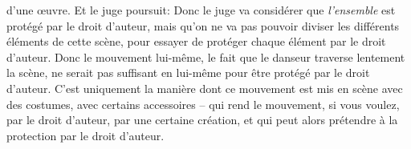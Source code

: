 {d'une {\oe}uvre. Et le juge poursuit:  Donc le juge va
consid\'erer que {\em l'ensemble} est prot\'eg\'e par le droit
d'auteur, mais qu'on ne va pas pouvoir diviser les diff\'erents
\'el\'ements de cette sc\`ene, pour essayer de prot\'eger chaque
\'el\'ement par le droit d'auteur. Donc le mouvement lui{}-m\^eme, le
fait que le danseur traverse lentement la sc\`ene, ne serait pas
suffisant en lui{}-m\^eme pour \^etre prot\'eg\'e par le droit
d'auteur. C'est uniquement la mani\`ere dont ce mouvement est mis en
sc\`ene avec des costumes, avec certains accessoires {--} qui rend le
mouvement, si vous voulez,  par le droit d'auteur, par une
certaine cr\'eation, et qui peut alors pr\'etendre \`a la protection
par le droit d'auteur.\par

}
